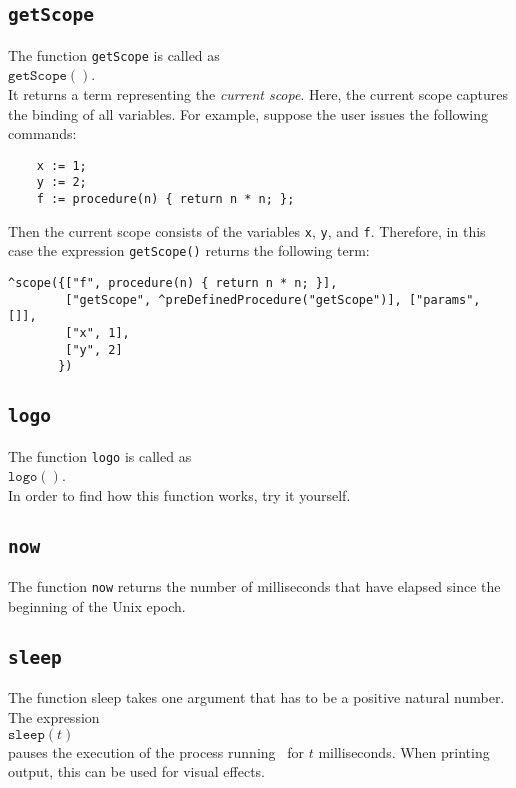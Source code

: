 \subsection{\texttt{getScope}}
The function \texttt{getScope}  is called as
\\[0.2cm]
\hspace*{1.3cm}
$\mathtt{getScope}()$.
\\[0.2cm]
It returns a term representing the  \emph{current scope}.  Here, the current scope
captures the binding of all variables.  For example, suppose the user issues the following
commands: 
\begin{verbatim}
    x := 1;
    y := 2;
    f := procedure(n) { return n * n; };
\end{verbatim}
Then the current scope consists of the variables \texttt{x}, \texttt{y}, and \texttt{f}.
Therefore, in this case the expression \texttt{getScope()} returns the following term:
\begin{verbatim}
^scope({["f", procedure(n) { return n * n; }], 
        ["getScope", ^preDefinedProcedure("getScope")], ["params", []], 
        ["x", 1], 
        ["y", 2]
       })
\end{verbatim}
 
\subsection{\texttt{logo}}
The function \texttt{logo}  is called as
\\[0.2cm]
\hspace*{1.3cm}
$\mathtt{logo}()$.
\\[0.2cm]
In order to find how this function works, try it yourself.

\subsection{\texttt{now}}
The function \texttt{now}  returns the number of milliseconds that have elapsed since
the beginning of the Unix epoch.

\subsection{\texttt{sleep}}
The function sleep takes one argument that has to be a positive natural number.  The expression
\\[0.2cm]
\hspace*{1.3cm}
$\texttt{sleep}(t)$
\\[0.2cm]
pauses the execution of the process running \setlx\ for $t$ milliseconds.  When printing
output, this can be used for visual effects.


